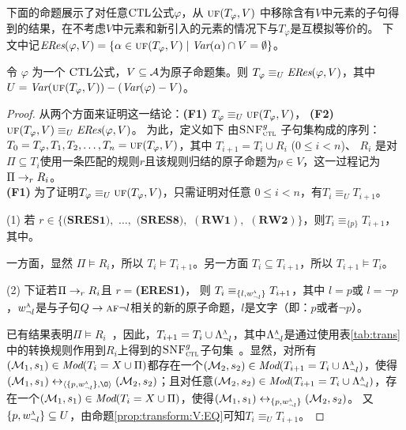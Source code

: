 下面的命题展示了对任意$\textrm{CTL}$公式$\varphi$，从 $\textsc{uf}(T_\varphi,V)$ 中移除含有$V$中元素的子句得到的结果，在不考虑$V$中元素和新引入的元素的情况下与$T_\varphi$是互模拟等价的。
下文中记$\emph{ERes}(\varphi,V) = \{\alpha\in \textsc{uf}(T_\varphi,V)\mid \textit{Var}(\alpha)\cap V=\emptyset\}$。
\begin{proposition}\label{pro:resEQ}
	令 $\varphi$ 为一个 $\textrm{CTL}$公式，$V\subseteq\cal A$为原子命题集。则
	$T_\varphi \equiv_U\emph{ERes}(\varphi,V)$，其中  $U=\textit{Var}(\textsc{uf}(T_\varphi,V))-(\textit{Var}(\varphi)-  V)$。
\end{proposition}
\begin{proof}
	从两个方面来证明这一结论：\textbf{(F1)} $T_\varphi \equiv_U \textsc{uf}(T_\varphi,V)$， \textbf{(F2)} $\textsc{uf}(T_\varphi,V) \equiv_{U} \emph{ERes}(\varphi,V)$。
	为此，定义如下 由${\textsc{SNF}_{\textsc{ctl}}^g}$ 子句集构成的序列： $T_0=T_{\varphi}, T_1, T_2, \dots, T_n = \textsc{uf}(T_\varphi,V)$，其中
	$T_{i+1} = T_i \cup R_i$ ($0\leq i < n$)、 $R_i$ 是对$\Pi \subseteq T_i$使用一条匹配的规则$r$且该规则归结的原子命题为$p\in V$，这一过程记为 $\Pi \rightarrow_r R_i$。
	\\
	
	\textbf{(F1)} 为了证明$T_\varphi \equiv_U \textsc{uf}(T_\varphi,V)$，只需证明对任意 $0\leq i < n$，有$T_i \equiv_{U} T_{i+1}$。
	
	
	
	(1) 若 $r\in \{\textbf{(SRES1)},$ $\dots,$ $\textbf{(SRES8)},$ $(\textbf{RW1}),$ $(\textbf{RW2})\}$，则$T_i \equiv_{\{p\}} T_{i+1}$，其中。
	
	
	一方面，显然 $\Pi \models R_i$，所以 $T_i \models T_{i+1}$。另一方面 $T_i\subseteq T_{i+1}$，所以 $T_{i+1} \models T_i$。
	
	(2) 下证若$\Pi \rightarrow_r R_i$且 $r=$\textbf{(ERES1)}，
	则 $T_i \equiv_{\{l, w_{\neg l}^{\textsc{a}}\}} T_{i+1}$，其中 $l = p$或 $l = \neg p$，$w_{\neg l}^{\textsc{a}}$是与子句$Q \rightarrow \textsc{a} \textsc{f} \neg l$相关的新的原子命题，$l$是文字（即：$p$或者$\neg p$）。
	
	已有结果表明$\Pi \models R_i$~\cite{bolotov2000clausal}，因此，$T_{i+1}=T_i \cup \Lambda_{\neg l}^{\textsc{a}}$，其中$\Lambda_{\neg l}^{\textsc{a}}$是通过使用表\ref{tab:trans}中的转换规则作用到$R_i$上得到的${\textsc{SNF}_{\textsc{ctl}}^g}$子句集~\cite{zhang2009refined}。显然，对所有$({\cal M}_1,s_1) \in \textit{Mod}(T_i= X \cup \Pi)$都存在一个$({\cal M}_2, s_2)\in \textit{Mod}(T_{i+1}=T_i \cup \Lambda_{\neg l}^{\textsc{a}})$，使得$(\Hm_1, s_1) \lrto_{\tuple{\{p, w_{\neg l}^{\ALL}\}, {\O}}} (\Hm_2, s_2)$；且对任意$({\cal M}_2, s_2)\in \textit{Mod}(T_{i+1}=T_i \cup \Lambda_{\neg l}^{\textsc{a}})$，存在一个$({\cal M}_1,s_1) \in \textit{Mod}(T_i= X \cup \Pi)$，使得$({\cal M}_1, s_1) \leftrightarrow_{\{p, w_{\neg l}^{\textsc{a}}\}} ({\cal M}_2, s_2)$。
	又$\{p, w_{\neg l}^{\textsc{a}}\} \subseteq U$，由命题\ref{prop:transform:V:EQ}可知$T_i \equiv_{U} T_{i+1}$。
	

\end{proof}
